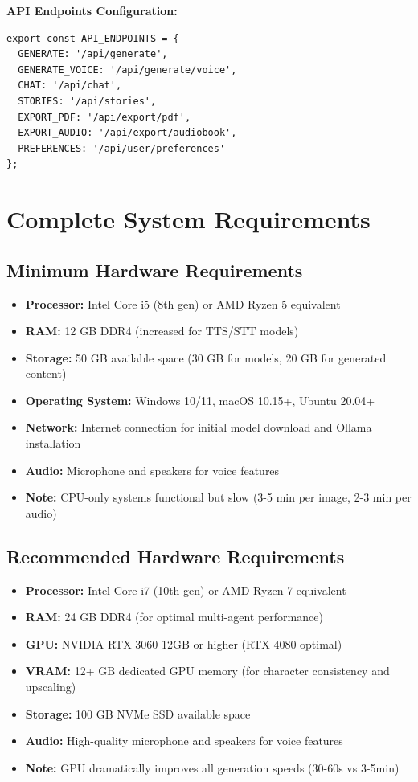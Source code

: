 {\textbf{API Endpoints Configuration:}
\begin{verbatim}
export const API_ENDPOINTS = {
  GENERATE: '/api/generate',
  GENERATE_VOICE: '/api/generate/voice',
  CHAT: '/api/chat',
  STORIES: '/api/stories',
  EXPORT_PDF: '/api/export/pdf',
  EXPORT_AUDIO: '/api/export/audiobook',
  PREFERENCES: '/api/user/preferences'
};
\end{verbatim}

\section{Complete System Requirements}

\subsection{Minimum Hardware Requirements}
\begin{itemize}
    \item \textbf{Processor:} Intel Core i5 (8th gen) or AMD Ryzen 5 equivalent
    \item \textbf{RAM:} 12 GB DDR4 (increased for TTS/STT models)
    \item \textbf{Storage:} 50 GB available space (30 GB for models, 20 GB for generated content)
    \item \textbf{Operating System:} Windows 10/11, macOS 10.15+, Ubuntu 20.04+
    \item \textbf{Network:} Internet connection for initial model download and Ollama installation
    \item \textbf{Audio:} Microphone and speakers for voice features
    \item \textbf{Note:} CPU-only systems functional but slow (3-5 min per image, 2-3 min per audio)
\end{itemize}

\subsection{Recommended Hardware Requirements}
\begin{itemize}
    \item \textbf{Processor:} Intel Core i7 (10th gen) or AMD Ryzen 7 equivalent
    \item \textbf{RAM:} 24 GB DDR4 (for optimal multi-agent performance)
    \item \textbf{GPU:} NVIDIA RTX 3060 12GB or higher (RTX 4080 optimal)
    \item \textbf{VRAM:} 12+ GB dedicated GPU memory (for character consistency and upscaling)
    \item \textbf{Storage:} 100 GB NVMe SSD available space
    \item \textbf{Audio:} High-quality microphone and speakers for voice features
    \item \textbf{Note:} GPU dramatically improves all generation speeds (30-60s vs 3-5min)
\end{itemize}

}
